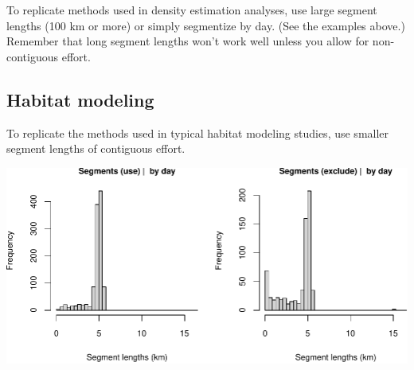 \documentclass[
]{book}
\newenvironment{Shaded}{\begin{snugshade}}{\end{snugshade}}
\newcommand{\CommentTok}[1]{\textcolor[rgb]{0.56,0.35,0.01}{\textit{#1}}}
\newcommand{\DataTypeTok}[1]{\textcolor[rgb]{0.13,0.29,0.53}{#1}}
\newcommand{\DecValTok}[1]{\textcolor[rgb]{0.00,0.00,0.81}{#1}}
\newcommand{\FloatTok}[1]{\textcolor[rgb]{0.00,0.00,0.81}{#1}}
\newcommand{\KeywordTok}[1]{\textcolor[rgb]{0.13,0.29,0.53}{\textbf{#1}}}
\newcommand{\NormalTok}[1]{#1}
\newcommand{\OperatorTok}[1]{\textcolor[rgb]{0.81,0.36,0.00}{\textbf{#1}}}
\newcommand{\OtherTok}[1]{\textcolor[rgb]{0.56,0.35,0.01}{#1}}
\newcommand{\StringTok}[1]{\textcolor[rgb]{0.31,0.60,0.02}{#1}}
\begin{document}
To replicate methods used in density estimation analyses, use large segment lengths (100 km or more) or simply segmentize by day. (See the examples above.) Remember that long segment lengths won't work well unless you allow for non-contiguous effort.

\hypertarget{habitat-modeling}{%
\subsection*{Habitat modeling}\label{habitat-modeling}}

To replicate the methods used in typical habitat modeling studies, use smaller segment lengths of contiguous effort.

\begin{Shaded}
\end{Shaded}

\includegraphics{figures/unnamed-chunk-460-1.pdf}
\end{document}
